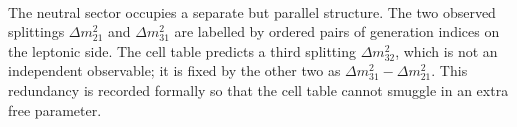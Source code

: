 \documentclass[11pt]{article}
\begin{document}
\begin{code}
\>[33]\AgdaSymbol{=}\AgdaSpace{}%
\<%
\\
%
\>[2]\AgdaSymbol{;}\AgdaSpace{}%
%
\>[33]\AgdaSymbol{=}\AgdaSpace{}%
\<%
\\
%
\>[2]\AgdaSymbol{;}\AgdaSpace{}%
%
\>[33]\AgdaSymbol{=}\AgdaSpace{}%
\<%
\\
%
\>[2]\AgdaSymbol{;}\AgdaSpace{}%
%
\>[33]\AgdaSymbol{=}\AgdaSpace{}%
\<%
\\
%
\>[2]\AgdaSymbol{;}\AgdaSpace{}%
%
\>[33]\AgdaSymbol{=}\AgdaSpace{}%
\<%
\\
%
\>[2]\AgdaSymbol{;}\AgdaSpace{}%
%
\>[33]\AgdaSymbol{=}\AgdaSpace{}%
\<%
\\
%
\>[2]\AgdaSymbol{;}\AgdaSpace{}%
%
\>[33]\AgdaSymbol{=}\AgdaSpace{}%
\<%
\\
%
\>[2]\AgdaSymbol{;}\AgdaSpace{}%
%
\>[33]\AgdaSymbol{=}\AgdaSpace{}%
\<%
\\
%
\>[2]\AgdaSymbol{;}\AgdaSpace{}%
%
\>[33]\AgdaSymbol{=}\AgdaSpace{}%
\<%
\\
%
\>[2]\AgdaSymbol{;}\AgdaSpace{}%
%
\>[33]\AgdaSymbol{=}\AgdaSpace{}%
\<%
\\
%
\>[2]\AgdaSymbol{;}\AgdaSpace{}%
%
\>[33]\AgdaSymbol{=}\AgdaSpace{}%
\<%
\\
%
\>[2]\AgdaSymbol{\}}\<%
\end{code}

The neutral sector occupies a separate but parallel structure.  The
two observed splittings $\Delta m^2_{21}$ and $\Delta m^2_{31}$ are
labelled by ordered pairs of generation indices on the leptonic side.
The cell table predicts a third splitting $\Delta m^2_{32}$, which is
not an independent observable; it is fixed by the other two as
$\Delta m^2_{31} - \Delta m^2_{21}$.  This redundancy is recorded
formally so that the cell table cannot smuggle in an extra free
parameter.
\end{document}
